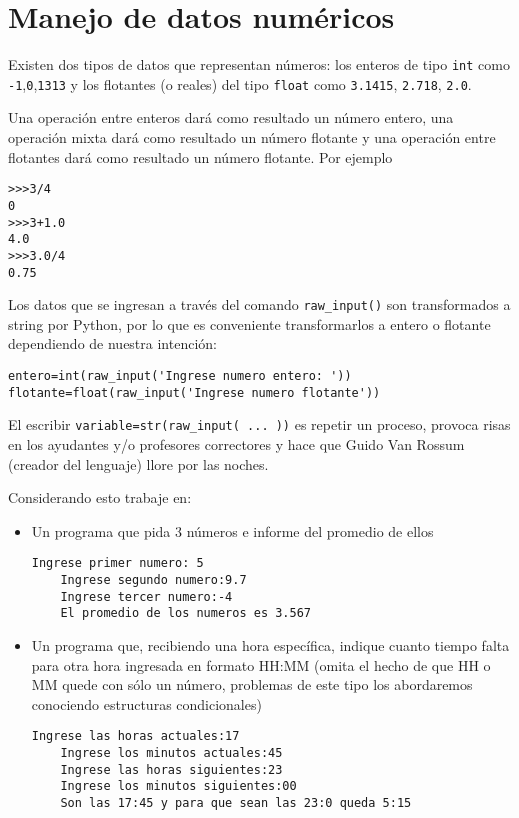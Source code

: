 \section{Manejo de datos numéricos}

Existen dos tipos de datos que representan números: los enteros de tipo \texttt{int} como \texttt{-1},\texttt{0},\texttt{1313} y los flotantes (o reales) del tipo \texttt{float} como \texttt{3.1415}, \texttt{2.718}, \texttt{2.0}.

Una operación entre enteros dará como resultado un número entero, una operación mixta dará como resultado un número flotante y una operación entre flotantes dará como resultado un número flotante. Por ejemplo

\begin{lstlisting}[style=consola]
>>>3/4
0
>>>3+1.0
4.0
>>>3.0/4
0.75
\end{lstlisting}

Los datos que se ingresan a través del comando \texttt{raw\_input()} son transformados a string por Python, por lo que es conveniente transformarlos a entero o flotante dependiendo de nuestra intención:

\begin{lstlisting}[style=consola]
entero=int(raw_input('Ingrese numero entero: '))
flotante=float(raw_input('Ingrese numero flotante'))
\end{lstlisting}

El escribir \texttt{variable=str(raw\_input( ... ))} es repetir un proceso, provoca risas en los ayudantes y/o profesores correctores y hace que Guido Van Rossum (creador del lenguaje) llore por las noches.


Considerando esto trabaje en:
\begin{itemize}
    \item Un programa que pida 3 números e informe del promedio de ellos
    \begin{lstlisting}[style=consola]
    Ingrese primer numero: 5
    Ingrese segundo numero:9.7
    Ingrese tercer numero:-4
    El promedio de los numeros es 3.567
    \end{lstlisting}
    
    \item Un programa que, recibiendo una hora específica, indique cuanto tiempo falta para otra hora ingresada en formato HH:MM (omita el hecho de que HH o MM quede con sólo un número, problemas de este tipo los abordaremos conociendo estructuras condicionales)
    
    \begin{lstlisting}[style=consola]
    Ingrese las horas actuales:17
    Ingrese los minutos actuales:45
    Ingrese las horas siguientes:23
    Ingrese los minutos siguientes:00
    Son las 17:45 y para que sean las 23:0 queda 5:15 
    \end{lstlisting}
\end{itemize}

